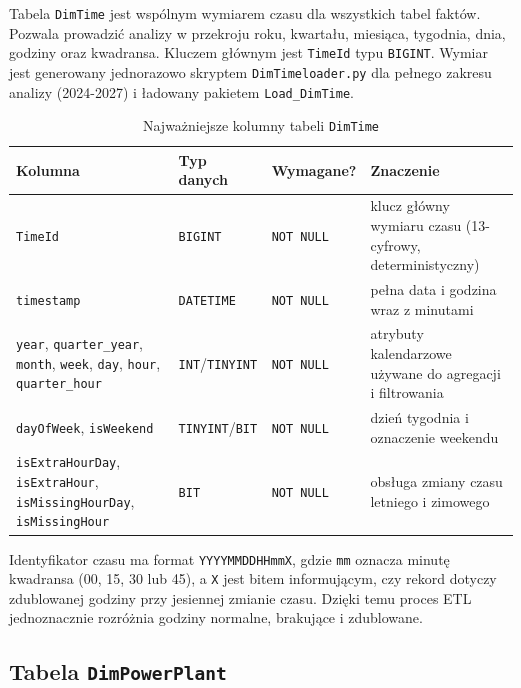 \documentclass[12pt]{article}
\begin{document}
	Tabela \texttt{DimTime} jest wspólnym wymiarem czasu dla wszystkich tabel faktów. Pozwala prowadzić analizy w przekroju roku, kwartału, miesiąca, tygodnia, dnia, godziny oraz kwadransa. Kluczem głównym jest \texttt{TimeId} typu \texttt{BIGINT}. Wymiar jest generowany jednorazowo skryptem \texttt{DimTimeloader.py} dla pełnego zakresu analizy (2024-2027) i ładowany pakietem \texttt{Load\_DimTime}.

	\begin{table}[h!]
		\centering
		\small
		\begin{tabularx}{\textwidth}{|p{3.1cm}|p{2.4cm}|p{2.5cm}|X|}
			\hline
			\textbf{Kolumna} & \textbf{Typ danych} & \textbf{Wymagane?} & \textbf{Znaczenie} \\
			\hline
			\texttt{TimeId} & \texttt{BIGINT} & \texttt{NOT NULL} & klucz główny wymiaru czasu (13-cyfrowy, deterministyczny) \\
			\hline
			\texttt{timestamp} & \texttt{DATETIME} & \texttt{NOT NULL} & pełna data i godzina wraz z minutami \\
			\hline
			\texttt{year}, \texttt{quarter\_year}, \texttt{month}, \texttt{week}, \texttt{day}, \texttt{hour}, \texttt{quarter\_hour} & \texttt{INT}/\texttt{TINYINT} & \texttt{NOT NULL} & atrybuty kalendarzowe używane do agregacji i filtrowania \\
			\hline
			\texttt{dayOfWeek}, \texttt{isWeekend} & \texttt{TINYINT}/\texttt{BIT} & \texttt{NOT NULL} & dzień tygodnia i oznaczenie weekendu \\
			\hline
			\texttt{isExtraHourDay}, \texttt{isExtraHour}, \texttt{isMissingHourDay}, \texttt{isMissingHour} & \texttt{BIT} & \texttt{NOT NULL} & obsługa zmiany czasu letniego i zimowego \\
			\hline
		\end{tabularx}
		\caption{Najważniejsze kolumny tabeli \texttt{DimTime}}
	\end{table}

	\noindent Identyfikator czasu ma format \texttt{YYYYMMDDHHmmX}, gdzie \texttt{mm} oznacza minutę kwadransa (00, 15, 30 lub 45), a \texttt{X} jest bitem informującym, czy rekord dotyczy zdublowanej godziny przy jesiennej zmianie czasu. Dzięki temu proces ETL jednoznacznie rozróżnia godziny normalne, brakujące i zdublowane.

	\subsection{Tabela \texttt{DimPowerPlant}}
\end{document}
